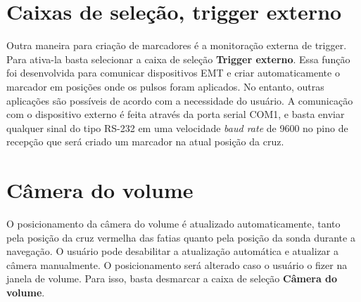 \section{Caixas de seleção, trigger externo}

Outra maneira para criação de marcadores é a monitoração externa de trigger. Para ativa-la basta selecionar a caixa de seleção \textbf{Trigger externo}. Essa função foi desenvolvida para comunicar dispositivos EMT e criar automaticamente o marcador em posições onde os pulsos foram aplicados. No entanto, outras aplicações são possíveis de acordo com a necessidade do usuário.
A comunicação com o dispositivo externo é feita através da porta serial COM1, e basta enviar qualquer sinal do tipo RS-232 em uma velocidade \textit{baud rate} de 9600 no pino de recepção que será criado um marcador na atual posição da cruz.

\section{Câmera do volume}

O posicionamento da câmera do volume é atualizado automaticamente, tanto pela posição da cruz vermelha das fatias quanto pela posição da sonda durante a navegação. O usuário pode desabilitar a atualização automática e atualizar a câmera manualmente. O posicionamento será alterado caso o usuário o fizer na janela de volume.  Para isso, basta desmarcar a caixa de seleção \textbf{Câmera do volume}.

